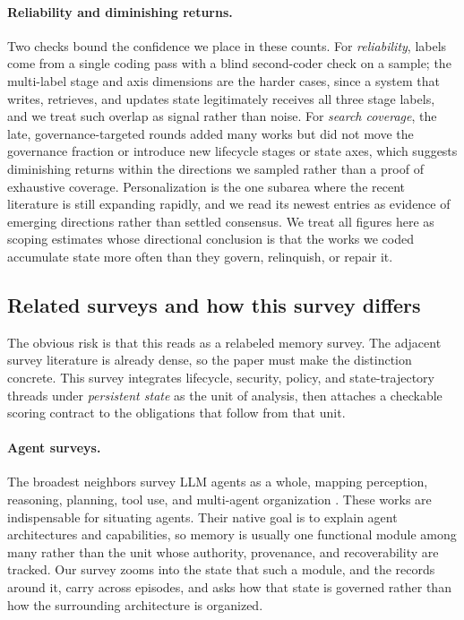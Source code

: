 \paragraph{Reliability and diminishing returns.} Two checks bound the confidence we place in these counts. For \emph{reliability}, labels come from a single coding pass with a blind second-coder check on a sample; the multi-label stage and axis dimensions are the harder cases, since a system that writes, retrieves, and updates state legitimately receives all three stage labels, and we treat such overlap as signal rather than noise. For \emph{search coverage}, the late, governance-targeted rounds added many works but did not move the governance fraction or introduce new lifecycle stages or state axes, which suggests diminishing returns within the directions we sampled rather than a proof of exhaustive coverage. Personalization is the one subarea where the recent literature is still expanding rapidly, and we read its newest entries as evidence of emerging directions rather than settled consensus. We treat all figures here as scoping estimates whose directional conclusion is that the works we coded accumulate state more often than they govern, relinquish, or repair it.

\subsection{Related surveys and how this survey differs}\label{sec:intro:related}

The obvious risk is that this reads as a relabeled memory survey. The adjacent survey literature is already dense, so the paper must make the distinction concrete. This survey integrates lifecycle, security, policy, and state-trajectory threads under \emph{persistent state} as the unit of analysis, then attaches a checkable scoring contract to the obligations that follow from that unit.

\paragraph{Agent surveys.} The broadest neighbors survey LLM agents as a whole, mapping perception, reasoning, planning, tool use, and multi-agent organization \citep{xi2023riseandpotential,wang2023surveylargelanguagemodelagents}. These works are indispensable for situating agents. Their native goal is to explain agent architectures and capabilities, so memory is usually one functional module among many rather than the unit whose authority, provenance, and recoverability are tracked. Our survey zooms into the state that such a module, and the records around it, carry across episodes, and asks how that state is governed rather than how the surrounding architecture is organized.


